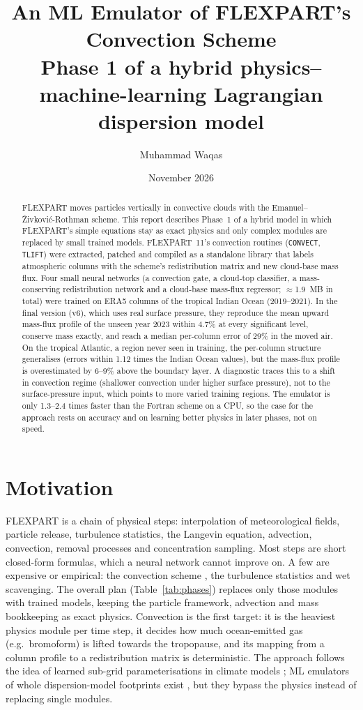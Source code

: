 \documentclass[11pt,a4paper]{article}
\title{\textbf{An ML Emulator of FLEXPART's Convection Scheme}\\[4pt]
\large Phase 1 of a hybrid physics--machine-learning Lagrangian dispersion model}
\author{Muhammad Waqas}
\date{November 2026}
\begin{document}
\maketitle

\begin{abstract}
FLEXPART moves particles vertically in convective clouds with the Emanuel--\v{Z}ivkovi\'{c}-Rothman
scheme. This report describes Phase~1 of a hybrid model in which FLEXPART's simple equations stay as
exact physics and only complex modules are replaced by small trained models. FLEXPART~11's convection
routines (\texttt{CONVECT}, \texttt{TLIFT}) were extracted, patched and compiled as a standalone library
that labels atmospheric columns with the scheme's redistribution matrix and new cloud-base mass flux.
Four small neural networks (a convection gate, a cloud-top classifier, a mass-conserving redistribution
network and a cloud-base mass-flux regressor; $\approx$1.9~MB in total) were trained on ERA5 columns of
the tropical Indian Ocean (2019--2021). In the final version (v6), which uses real surface pressure, they
reproduce the mean upward mass-flux profile of the unseen year 2023 within 4.7\% at every significant
level, conserve mass exactly, and reach a median per-column error of 29\% in the moved air. On the
tropical Atlantic, a region never seen in training, the per-column structure generalises (errors within
1.12 times the Indian Ocean values), but the mass-flux profile is overestimated by 6--9\% above the
boundary layer. A diagnostic traces this to a shift in convection regime (shallower convection under
higher surface pressure), not to the surface-pressure input, which points to more varied training
regions. The emulator is only 1.3--2.4 times faster than the Fortran scheme on a CPU, so the case for
the approach rests on accuracy and on learning better physics in later phases, not on speed.
\end{abstract}

\section{Motivation}
FLEXPART \citep[][]{stohl2005,pisso2019,bakels2024} is a chain of physical steps: interpolation of
meteorological fields, particle release, turbulence statistics, the Langevin equation, advection,
convection, removal processes and concentration sampling. Most steps are short closed-form formulas,
which a neural network cannot improve on. A few are expensive or empirical: the convection scheme
\citep{emanuel1999,forster2007}, the turbulence statistics and wet scavenging. The overall plan
(Table~\ref{tab:phases}) replaces only those modules with trained models, keeping the particle
framework, advection and mass bookkeeping as exact physics. Convection is the first target: it is the
heaviest physics module per time step, it decides how much ocean-emitted gas (e.g.\ bromoform) is
lifted towards the tropopause, and its mapping from a column profile to a redistribution matrix is
deterministic. The approach follows the idea of learned sub-grid parameterisations in climate models
\citep{rasp2018}; ML emulators of whole dispersion-model footprints exist \citep{fillola2023,he2025},
but they bypass the physics instead of replacing single modules.
\end{document}
